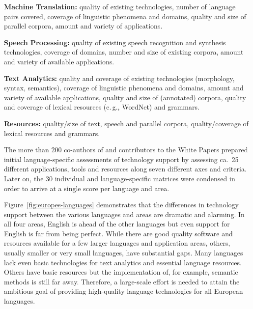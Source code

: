 \documentclass[10pt, plain]{../../metanetpaper}
\begin{document}
\begin{multicols}{2}
\textbf{Machine Translation:} quality of existing technologies, number of language pairs covered, coverage of linguistic phenomena and domains, quality and size of parallel corpora, amount and variety of applications.

\textbf{Speech Processing:} quality of existing speech recognition and synthesis technologies, coverage of domains, number and size of existing corpora, amount and variety of available applications.

\textbf{Text Analytics:} quality and coverage of existing technologies (morphology, syntax, semantics), coverage of linguistic phenomena and domains, amount and variety of available applications, quality and size of (annotated) corpora, quality and coverage of lexical resources (e.\,g., WordNet) and grammars.

\textbf{Resources:} quality/size of text, speech and parallel corpora, quality/coverage of lexical resources and grammars.

The more than 200 co-authors of and contributors to the White Papers prepared initial language-specific assessments of technology support by assessing ca.~25 different applications, tools and resources along seven different axes and criteria. Later on, the 30 individual and language-specific matrices were condensed in order to arrive at a single score per language and area. 

Figure~\ref{fig:europes-languages} demonstrates that the differences in technology support between the various languages and areas are dramatic and alarming. In all four areas, English is ahead of the other languages but even support for English is far from being perfect. While there are good quality software and resources available for a few larger languages and application areas, others, usually smaller or very small languages, have substantial gaps. Many languages lack even basic technologies for text analytics and essential language resources. Others have basic resources but the implementation of, for example, semantic methods is still far away. Therefore, a large-scale effort is needed to attain the ambitious goal of providing high-quality language technologies for all European languages.


\end{multicols}
\end{document}
